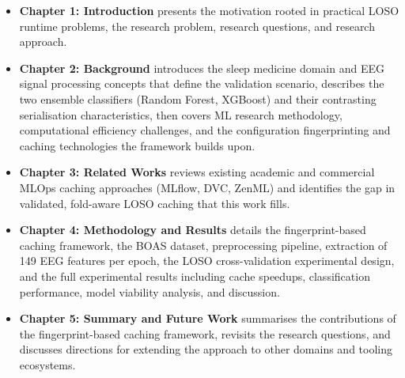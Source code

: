 \begin{itemize}
\item \textbf{Chapter 1: Introduction} presents the motivation rooted in
practical LOSO runtime problems, the research problem, research questions,
and research approach.

\item \textbf{Chapter 2: Background} introduces the sleep medicine domain
and EEG signal processing concepts that define the validation scenario,
describes the two ensemble classifiers (Random Forest, XGBoost) and their
contrasting serialisation characteristics, then covers ML research methodology,
computational efficiency challenges, and the configuration fingerprinting
and caching technologies the framework builds upon.

\item \textbf{Chapter 3: Related Works} reviews existing academic and commercial MLOps caching approaches (MLflow, DVC, ZenML) and identifies the gap in validated, fold-aware LOSO caching that this work fills.

\item \textbf{Chapter 4: Methodology and Results} details the fingerprint-based
caching framework, the BOAS dataset, preprocessing pipeline, extraction of
149 EEG features per epoch, the LOSO cross-validation experimental design,
and the full experimental results including cache speedups, classification
performance, model viability analysis, and discussion.

\item \textbf{Chapter 5: Summary and Future Work} summarises the contributions
of the fingerprint-based caching framework, revisits the research questions,
and discusses directions for extending the approach to other domains and tooling
ecosystems.
\end{itemize}
